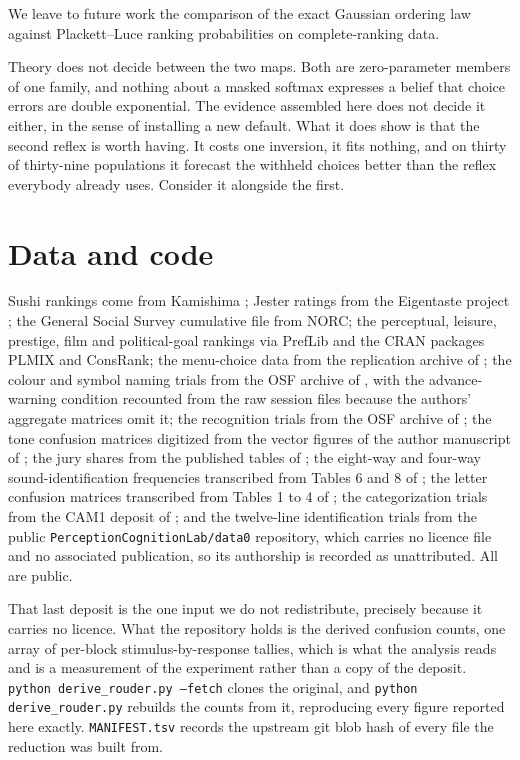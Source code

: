 \documentclass[11pt]{article}
\begin{document}
We leave to future work the comparison of the exact Gaussian ordering law against
Plackett--Luce ranking probabilities on complete-ranking data.

Theory does not decide between the two maps. Both are zero-parameter members of one family, and
nothing about a masked softmax expresses a belief that choice errors are double exponential. The
evidence assembled here does not decide it either, in the sense of installing a new default. What
it does show is that the second reflex is worth having. It costs one inversion, it fits nothing,
and on thirty of thirty-nine populations it forecast the withheld choices better than the reflex
everybody already uses. Consider it alongside the first.

\section*{Data and code}

Sushi rankings come from Kamishima \cite{kamishima2003}; Jester ratings from the
Eigentaste project \cite{goldberg2001}; the General Social Survey cumulative file from
NORC; the perceptual, leisure, prestige, film and political-goal rankings via PrefLib
\cite{mattei2013} and the CRAN packages PLMIX and ConsRank; the menu-choice data from
the replication archive of \cite{costagomes2022}; the colour and symbol naming trials from
the OSF archive of \cite{yeonrahnev2020}, with the advance-warning condition recounted from
the raw session files because the authors' aggregate matrices omit it; the recognition
trials from the OSF archive of \cite{utochkin2025}; the tone confusion matrices digitized
from the vector figures of the author manuscript of \cite{stewart2005}; the jury shares from
the published tables of \cite{ormston2019}; the eight-way and four-way sound-identification
frequencies transcribed from Tables 6 and 8 of \cite{getty1979}; the letter confusion matrices
transcribed from Tables 1 to 4 of \cite{townsendlandon1982}; the categorization trials from the
CAM1 deposit of \cite{wills2000}; and the twelve-line identification trials from the public
\texttt{PerceptionCognitionLab/data0} repository, which carries no licence file and no
associated publication, so its authorship is recorded as unattributed. All are public.

That last deposit is the one input we do not redistribute, precisely because it carries no
licence. What the repository holds is the derived confusion counts, one array of per-block
stimulus-by-response tallies, which is what the analysis reads and is a measurement of the
experiment rather than a copy of the deposit. \texttt{python derive\_rouder.py --fetch} clones
the original, and \texttt{python derive\_rouder.py} rebuilds the counts from it, reproducing
every figure reported here exactly. \texttt{MANIFEST.tsv} records the upstream git blob hash
of every file the reduction was built from.
\end{document}
